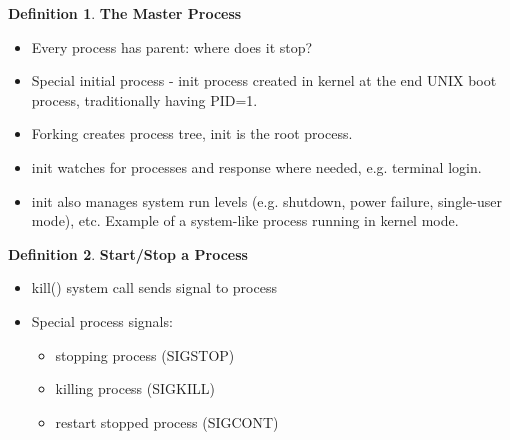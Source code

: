 \documentclass[12pt,a4paper]{article}
\theoremstyle{definition}
\newtheorem{definition}{Definition}[section]
\newenvironment{myitemize}
{ \begin{itemize}
    \setlength{\itemsep}{5pt}
    \setlength{\parskip}{0pt}
    \setlength{\parsep}{0pt}     }
{ \end{itemize}                  }
\begin{document}
\begin{definition}{\textbf{The Master Process}}
	\begin{myitemize}
		\item Every process has parent: \textsf{where does it stop?}
		\item Special initial process - \textsf{init} process created in kernel at the end UNIX boot process, traditionally having PID=1.
		\item Forking creates process tree, \textsf{init} is the root process.
		\item \textsf{init} watches for processes and response where needed, e.g. terminal login.
		\item \textsf{init} also manages system run levels (e.g. shutdown, power failure, single-user mode), etc. Example of a system-like process running in kernel mode.
	\end{myitemize}
\end{definition}

\begin{definition}{\textbf{Start/Stop a Process}}
	\begin{myitemize}
		\item kill() system call sends signal to process
		\item Special process signals:
		\begin{myitemize}
			\item stopping process (SIGSTOP)
			\item killing process (SIGKILL)
			\item restart stopped process (SIGCONT)
		\end{myitemize}
	\end{myitemize}
\end{definition}
\end{document}
